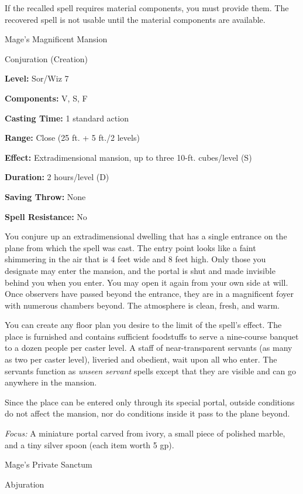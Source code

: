 \documentclass{article}
\begin{document}
If the recalled spell requires material components, you must provide them. The 
recovered spell is not usable until the material components are available.

\vspace{12pt}
Mage's Magnificent Mansion

Conjuration (Creation)

\textbf{Level:} Sor/Wiz 7

\textbf{Components:} V, S, F

\textbf{Casting Time:} 1 standard action

\textbf{Range:} Close (25 ft. + 5 ft./2 levels)

\textbf{Effect:} Extradimensional mansion, up to three 10-ft. cubes/level (S)

\textbf{Duration:} 2 hours/level (D)

\textbf{Saving Throw:} None

\textbf{Spell Resistance:} No

You conjure up an extradimensional dwelling that has a single entrance on the plane 
from which the spell was cast. The entry point looks like a faint shimmering in 
the air that is 4 feet wide and 8 feet high. Only those you designate may enter 
the mansion, and the portal is shut and made invisible behind you when you enter. 
You may open it again from your own side at will. Once observers have passed beyond 
the entrance, they are in a magnificent foyer with numerous chambers beyond. The 
atmosphere is clean, fresh, and warm.

You can create any floor plan you desire to the limit of the spell's effect. The 
place is furnished and contains sufficient foodstuffs to serve a nine-course banquet 
to a dozen people per caster level. A staff of near-transparent servants (as many 
as two per caster level), liveried and obedient, wait upon all who enter. The servants 
function as \textit{unseen servant }spells except that they are visible and can 
go anywhere in the mansion.

Since the place can be entered only through its special portal, outside conditions 
do not affect the mansion, nor do conditions inside it pass to the plane beyond.

\textit{Focus: }A miniature portal carved from ivory, a small piece of polished 
marble, and a tiny silver spoon (each item worth 5 gp).

\vspace{12pt}
Mage's Private Sanctum

Abjuration
\end{document}
